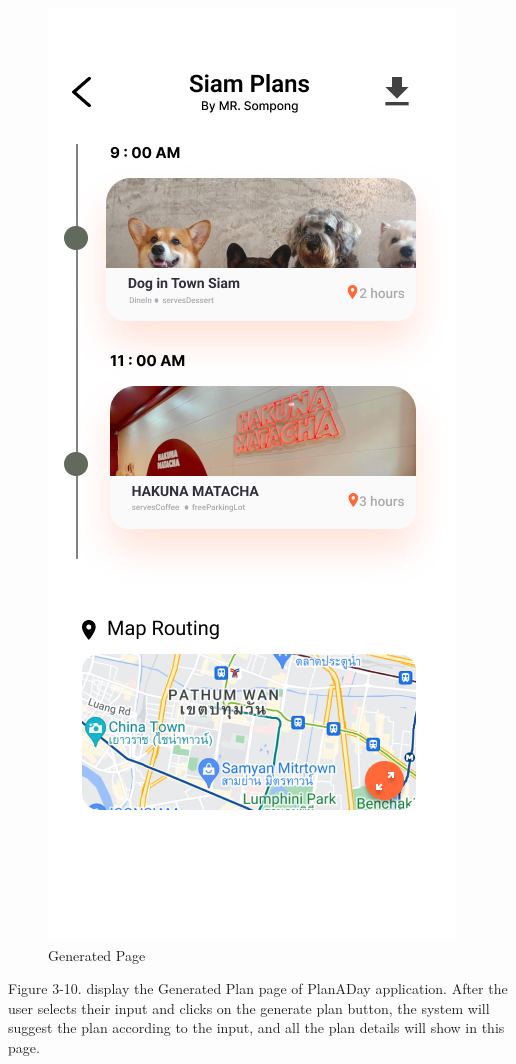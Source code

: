 \newpage
\begin{figure}[!h]
    \centering
    \includegraphics[width=0.5\linewidth]{chapter3/UI_Other_plan.png}
    \caption{Generated Page}
    \label{fig:Generated Page}
\end{figure}
\noindent
Figure 3-10. display the Generated Plan page of PlanADay application. After the
user selects their input and clicks on the generate plan button, the system will
suggest the plan according to the input, and all the plan details will show in this
page.


